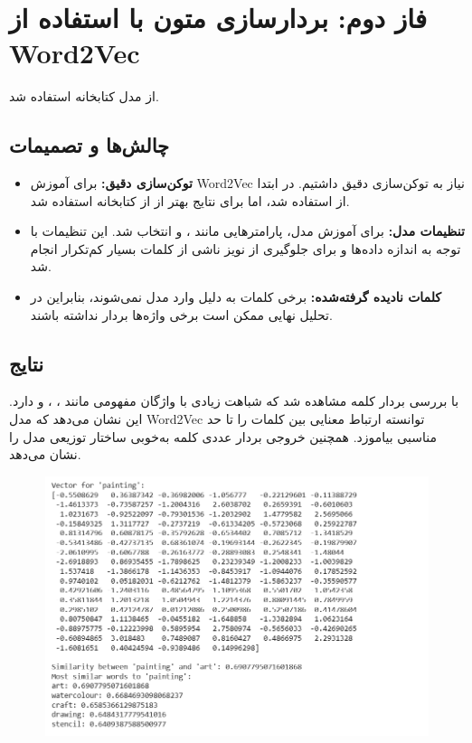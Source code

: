 \documentclass[a4paper,12pt]{article}
\let\nobreaksection\section
\renewcommand{\section}{\nobreaksection}
\begin{document}
	\section{فاز دوم: بردارسازی متون با استفاده از Word2Vec}
	 از مدل  کتابخانه  استفاده شد.
	
	\subsection{چالش‌ها و تصمیمات}
	\begin{itemize}
		\item \textbf{توکن‌سازی دقیق:} برای آموزش Word2Vec نیاز به توکن‌سازی دقیق داشتیم. در ابتدا از  استفاده شد، اما برای نتایج بهتر از  از کتابخانه  استفاده شد.
		
		\item \textbf{تنظیمات مدل:} برای آموزش مدل، پارامترهایی مانند ،  و  انتخاب شد. این تنظیمات با توجه به اندازه داده‌ها و برای جلوگیری از نویز ناشی از کلمات بسیار کم‌تکرار انجام شد.
		
		\item \textbf{کلمات نادیده گرفته‌شده:} برخی کلمات به دلیل  وارد مدل نمی‌شوند، بنابراین در تحلیل نهایی ممکن است برخی واژه‌ها بردار نداشته باشند.
	\end{itemize}
	
	\subsection{نتایج}
	با بررسی بردار کلمه  مشاهده شد که شباهت زیادی با واژگان مفهومی مانند ، ، و  دارد. این نشان می‌دهد که مدل Word2Vec توانسته ارتباط معنایی بین کلمات را تا حد مناسبی بیاموزد. همچنین خروجی بردار عددی کلمه  به‌خوبی ساختار توزیعی مدل را نشان می‌دهد.
		\begin{figure}[h]
		\centering
		\includegraphics[width=1\textwidth]{2-2.png}
	\end{figure}
	\FloatBarrier
\end{document}
